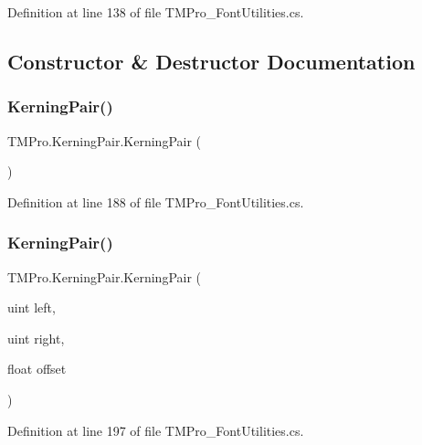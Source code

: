 Definition at line 138 of file T\+M\+Pro\+\_\+\+Font\+Utilities.\+cs.



\subsection{Constructor \& Destructor Documentation}
\mbox{\label{class_t_m_pro_1_1_kerning_pair_a032626cb5e1418985149eecc02e321ff}} 
\subsubsection{\texorpdfstring{KerningPair()}{KerningPair()}\hspace{0.1cm}{\footnotesize\ttfamily [1/3]}}
{\footnotesize\ttfamily T\+M\+Pro.\+Kerning\+Pair.\+Kerning\+Pair (\begin{DoxyParamCaption}{ }\end{DoxyParamCaption})}



Definition at line 188 of file T\+M\+Pro\+\_\+\+Font\+Utilities.\+cs.

\mbox{\label{class_t_m_pro_1_1_kerning_pair_a180b8ff824757b096d9ad32dd4655919}} 
\subsubsection{\texorpdfstring{KerningPair()}{KerningPair()}\hspace{0.1cm}{\footnotesize\ttfamily [2/3]}}
{\footnotesize\ttfamily T\+M\+Pro.\+Kerning\+Pair.\+Kerning\+Pair (\begin{DoxyParamCaption}\item[{uint}]{left,  }\item[{uint}]{right,  }\item[{float}]{offset }\end{DoxyParamCaption})}



Definition at line 197 of file T\+M\+Pro\+\_\+\+Font\+Utilities.\+cs.

\mbox{\label{class_t_m_pro_1_1_kerning_pair_aae1c4176e2099f2cb8ff1c6fb093e2bb}} 
